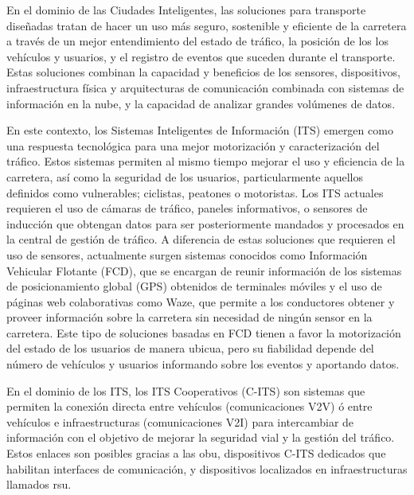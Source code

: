 En el dominio de las Ciudades Inteligentes, las soluciones para transporte diseñadas tratan
de hacer un uso más seguro, sostenible y eficiente de la carretera a través de un mejor
entendimiento del estado de tráfico, la posición de los los vehículos y usuarios, y el
registro de eventos que suceden durante el transporte. Estas soluciones combinan la capacidad
y beneficios de los sensores, dispositivos, infraestructura física y arquitecturas de
comunicación combinada con sistemas de información en la nube, y la capacidad de analizar
grandes volúmenes de datos.

En este contexto, los Sistemas Inteligentes de Información (ITS) emergen como una respuesta
tecnológica para una mejor motorización y caracterización del tráfico. Estos sistemas
permiten al mismo tiempo mejorar el uso y eficiencia de la carretera, así como la seguridad
de los usuarios, particularmente aquellos definidos como vulnerables; ciclistas, peatones o
motoristas. Los ITS actuales requieren el uso de cámaras de tráfico, paneles informativos,
o sensores de inducción que obtengan datos para ser posteriormente mandados y procesados en
la central de gestión de tráfico. A diferencia de estas soluciones que requieren el uso de
sensores, actualmente surgen sistemas conocidos como Información Vehicular Flotante (FCD),
que se encargan de reunir información de los sistemas de posicionamiento global (GPS) obtenidos
de terminales móviles y el uso de páginas web colaborativas como Waze, que permite a los
conductores obtener y proveer información sobre la carretera sin necesidad de ningún sensor
en la carretera. Este tipo de soluciones basadas en FCD tienen a favor la motorización del
estado de los usuarios de manera ubicua, pero su fiabilidad depende del número de vehículos y
usuarios informando sobre los eventos y aportando datos.

En el dominio de los ITS, los ITS Cooperativos (C-ITS) son sistemas que permiten la conexión
directa entre vehículos (comunicaciones V2V) ó entre vehículos e infraestructuras
(comunicaciones V2I) para intercambiar de información con el objetivo de mejorar la seguridad
vial y la gestión del tráfico. Estos enlaces son posibles gracias a las \gls{obu}, dispositivos
C-ITS dedicados que habilitan interfaces de comunicación, y dispositivos localizados en
infraestructuras llamados \gls{rsu}.

